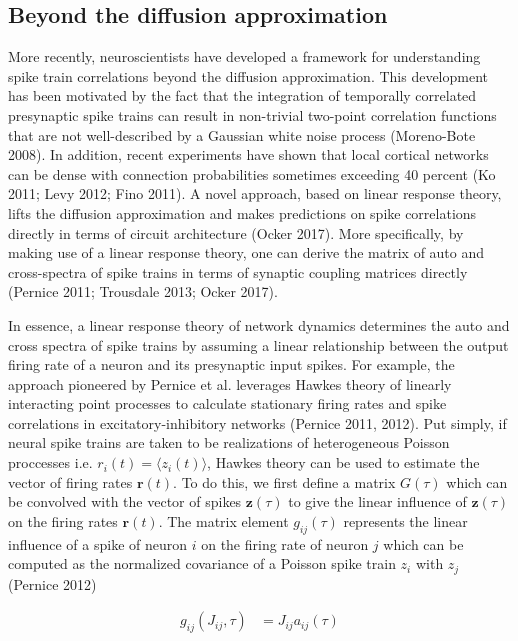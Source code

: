 \documentclass{ucetd}
\begin{document}
\subsection{Beyond the diffusion approximation}

More recently, neuroscientists have developed a framework for understanding spike train correlations beyond the diffusion approximation. This development has been motivated by the fact that the integration of temporally correlated presynaptic spike trains can result in non-trivial two-point correlation functions that are not well-described by a Gaussian white noise process (Moreno-Bote 2008). In addition, recent experiments have shown that local cortical networks can be dense with connection probabilities sometimes exceeding 40 percent (Ko 2011; Levy 2012; Fino 2011). A novel approach, based on linear response theory, lifts the diffusion approximation and makes predictions on spike correlations directly in terms of circuit architecture (Ocker 2017). More specifically, by making use of a linear response theory, one can derive the matrix of auto and cross-spectra of spike trains in terms of synaptic coupling matrices directly (Pernice 2011; Trousdale 2013; Ocker 2017).

In essence, a linear response theory of network dynamics determines the auto and cross spectra of spike trains by assuming a linear relationship between the output firing rate of a neuron and its presynaptic input spikes. For example, the approach pioneered by Pernice et al. leverages Hawkes theory of linearly interacting point processes to calculate stationary firing rates and spike correlations in excitatory-inhibitory networks (Pernice 2011, 2012). Put simply, if neural spike trains are taken to be realizations of heterogeneous Poisson proccesses i.e. $r_{i}(t) = \langle z_{i}(t)\rangle$, Hawkes theory can be used to estimate the vector of firing rates $\mathbf{r}(t)$. To do this, we first define a matrix $G(\tau)$ which can be convolved with the vector of spikes $\mathbf{z}(\tau)$ to give the linear influence of $\mathbf{z}(\tau)$ on the firing rates $\mathbf{r}(t)$. The matrix element $g_{ij}(\tau)$ represents the linear influence of a spike of neuron $i$ on the firing rate of neuron $j$ which can be computed as the normalized covariance of a Poisson spike train $z_{i}$ with $z_{j}$ (Pernice 2012)

\begin{align}
g_{ij}(J_{ij},\tau) &= J_{ij}a_{ij}(\tau)
\end{align} 
\end{document}

